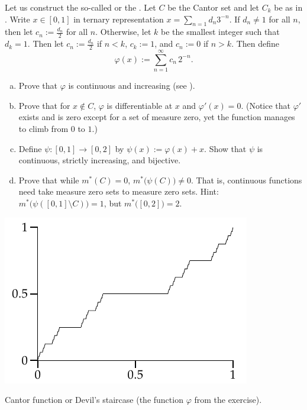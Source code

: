 \begin{samepage}
\begin{exercise}[Challenging]
Let us construct the so-called \emph{} or the 
\emph{}.  Let $C$ be the Cantor set and
let $C_k$ be as in .
Write $x \in [0,1]$ in ternary representation $x = \sum_{n=1} d_n 3^{-n}$.
If $d_n \not= 1$ for all $n$, then let $c_n := \frac{d_n}{2}$ for all $n$.
Otherwise, let $k$ be the smallest integer such that $d_k = 1$.  Then
let $c_n := \frac{d_n}{2}$ if $n < k$, $c_k := 1$, and $c_n := 0$ if $n >
k$.  Then define
\begin{equation*}
\varphi(x) := \sum_{n=1}^\infty c_n \, 2^{-n} .
\end{equation*}
\begin{enumerate}[a)]
\item
Prove that $\varphi$ is continuous and increasing (see
).
\item
Prove that for $x \notin C$, $\varphi$ is differentiable at $x$ and
$\varphi'(x) = 0$.
(Notice that $\varphi'$ exists and is zero except for a set of measure zero,
yet the function manages to climb from $0$ to $1$.)
\item
Define $\psi \colon [0,1] \to [0,2]$ by
$\psi(x) := \varphi(x) + x$.
Show that $\psi$ is continuous, strictly increasing, and bijective.
\item
Prove that while $m^*(C) = 0$, $m^*\bigl(\psi(C)\bigr) \not= 0$.  That is,
continuous functions need take measure zero sets to measure zero sets.
Hint: $m^*\bigl(\psi([0,1] \setminus C)\bigr) = 1$, but
$m^*\bigl([0,2]\bigr) = 2$.
\end{enumerate}
\end{exercise}
\end{samepage}

\begin{myfigureht}
\includegraphics{figures/cantorfunction}
\caption{Cantor function or Devil's staircase (the function $\varphi$ from
the exercise).\label{fig:cantorfunction}}
\end{myfigureht}

